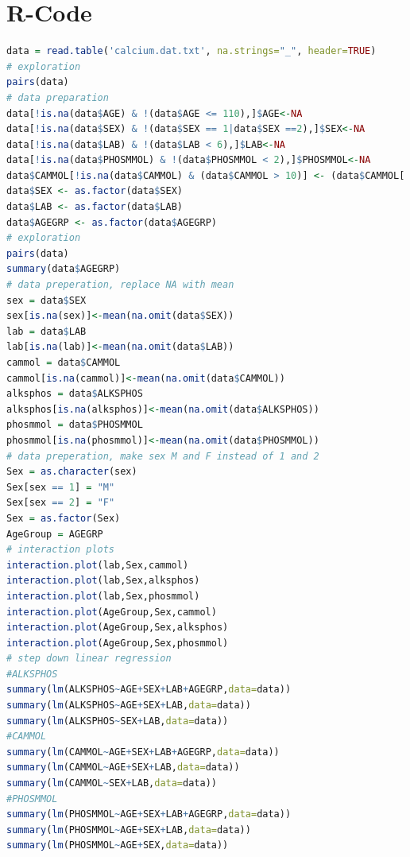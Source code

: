 \documentclass{article}
\begin{document}
  \section{R-Code}
    \begin{lstlisting}[language=R]
data = read.table('calcium.dat.txt', na.strings="_", header=TRUE)
# exploration
pairs(data)
# data preparation
data[!is.na(data$AGE) & !(data$AGE <= 110),]$AGE<-NA
data[!is.na(data$SEX) & !(data$SEX == 1|data$SEX ==2),]$SEX<-NA
data[!is.na(data$LAB) & !(data$LAB < 6),]$LAB<-NA
data[!is.na(data$PHOSMMOL) & !(data$PHOSMMOL < 2),]$PHOSMMOL<-NA
data$CAMMOL[!is.na(data$CAMMOL) & (data$CAMMOL > 10)] <- (data$CAMMOL[!is.na(data$CAMMOL) & (data$CAMMOL > 10)])/10
data$SEX <- as.factor(data$SEX)
data$LAB <- as.factor(data$LAB)
data$AGEGRP <- as.factor(data$AGEGRP)
# exploration
pairs(data)
summary(data$AGEGRP)
# data preperation, replace NA with mean
sex = data$SEX
sex[is.na(sex)]<-mean(na.omit(data$SEX))
lab = data$LAB
lab[is.na(lab)]<-mean(na.omit(data$LAB))
cammol = data$CAMMOL
cammol[is.na(cammol)]<-mean(na.omit(data$CAMMOL))
alksphos = data$ALKSPHOS
alksphos[is.na(alksphos)]<-mean(na.omit(data$ALKSPHOS))
phosmmol = data$PHOSMMOL
phosmmol[is.na(phosmmol)]<-mean(na.omit(data$PHOSMMOL))
# data preperation, make sex M and F instead of 1 and 2
Sex = as.character(sex)
Sex[sex == 1] = "M"
Sex[sex == 2] = "F"
Sex = as.factor(Sex)
AgeGroup = AGEGRP
# interaction plots
interaction.plot(lab,Sex,cammol)
interaction.plot(lab,Sex,alksphos)
interaction.plot(lab,Sex,phosmmol)
interaction.plot(AgeGroup,Sex,cammol)
interaction.plot(AgeGroup,Sex,alksphos)
interaction.plot(AgeGroup,Sex,phosmmol)
# step down linear regression
#ALKSPHOS
summary(lm(ALKSPHOS~AGE+SEX+LAB+AGEGRP,data=data))
summary(lm(ALKSPHOS~AGE+SEX+LAB,data=data))
summary(lm(ALKSPHOS~SEX+LAB,data=data))
#CAMMOL
summary(lm(CAMMOL~AGE+SEX+LAB+AGEGRP,data=data))
summary(lm(CAMMOL~AGE+SEX+LAB,data=data))
summary(lm(CAMMOL~SEX+LAB,data=data))
#PHOSMMOL
summary(lm(PHOSMMOL~AGE+SEX+LAB+AGEGRP,data=data))
summary(lm(PHOSMMOL~AGE+SEX+LAB,data=data))
summary(lm(PHOSMMOL~AGE+SEX,data=data))
    \end{lstlisting}
\end{document}
